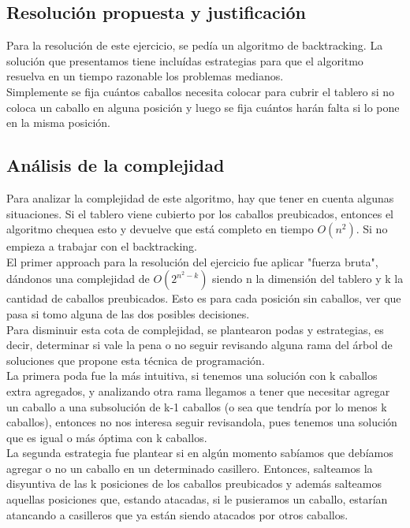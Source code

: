 \newpage
\subsection{Resoluci\'on propuesta y justificaci\'on}
Para la resoluci\'on de este ejercicio, se ped\'ia un algoritmo de backtracking. La soluci\'on que presentamos tiene inclu\'idas estrategias para que el algoritmo resuelva en un tiempo razonable los problemas medianos.\\

Simplemente se fija cu\'antos caballos necesita colocar para cubrir el tablero si no coloca un caballo en alguna posici\'on y luego se fija cu\'antos har\'an falta si lo pone en la misma posici\'on.\\

\newpage

\subsection{An\'alisis de la complejidad}
Para analizar la complejidad de este algoritmo, hay que tener en cuenta algunas situaciones. Si el tablero viene cubierto por los caballos preubicados, entonces el algoritmo chequea esto y devuelve que est\'a completo en tiempo $O(n^{2})$. Si no empieza a trabajar con el backtracking.\\

El primer approach para la resoluci\'on del ejercicio fue aplicar "fuerza bruta", d\'andonos una complejidad de $O(2^{n^{2} - k})$ siendo n la dimensi\'on del tablero y k la cantidad de caballos preubicados. Esto es para cada posici\'on sin caballos, ver que pasa si tomo alguna de las dos posibles decisiones.\\

Para disminuir esta cota de complejidad, se plantearon podas y estrategias, es decir, determinar si vale la pena o no seguir revisando alguna rama del \'arbol de soluciones que propone esta t\'ecnica de programaci\'on.\\

La primera poda fue la m\'as intuitiva, si tenemos una soluci\'on con k caballos extra agregados,  y analizando otra rama llegamos a tener que necesitar agregar un caballo a una subsoluci\'on de k-1 caballos (o sea que tendr\'ia por lo menos k caballos), entonces no nos interesa seguir revisandola, pues tenemos una soluci\'on que es igual o m\'as \'optima con k caballos.\\

La segunda estrategia fue plantear si en alg\'un momento sab\'iamos que deb\'iamos agregar o no un caballo en un determinado casillero. Entonces, salteamos la disyuntiva de las k posiciones de los caballos preubicados y adem\'as salteamos aquellas posiciones que, estando atacadas, si le pusieramos un caballo, estar\'ian atancando a casilleros que ya est\'an siendo atacados por otros caballos.\\

